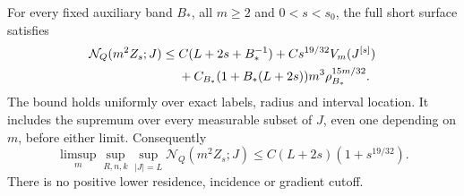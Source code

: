 \begin{theorem}
\label{thm:v89-endpoint-surface}
For every fixed auxiliary band $B_*$, all $m\ge2$ and
$0<s<s_0$, the full short surface satisfies
\begin{align}
 \mathcal N_Q(m^2Z_s;J)\le{}&C(L+2s+B_*^{-1})
           +Cs^{19/32}V_m(J^{[s]})\notag\\
 &+C_{B_*}(1+B_*(L+2s))m^3\rho_{B_*}^{15m/32}.
                                      \label{eq:v89-critical-finite}
\end{align}
The bound holds uniformly over exact labels, radius and interval
location. It includes the supremum over every measurable subset of
$J$, even one depending on $m$, before either limit. Consequently
\begin{equation}\label{eq:v89-critical-ordered}
 \limsup_m\sup_{R,n,k}\sup_{|J|=L}\mathcal N_Q(m^2Z_s;J)
                 \le C(L+2s)(1+s^{19/32}).
\end{equation}
There is no positive lower residence, incidence or gradient cutoff.
\end{theorem}
